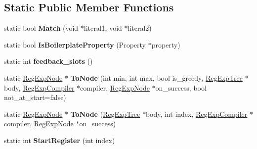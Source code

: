 \subsection*{Static Public Member Functions}
\begin{DoxyCompactItemize}
\item 
\hypertarget{classv8_1_1internal_1_1_v8___f_i_n_a_l_a3eaeaa0e38cbfa8e72233e319be96cd3}{}static bool {\bfseries Match} (void $\ast$literal1, void $\ast$literal2)\label{classv8_1_1internal_1_1_v8___f_i_n_a_l_a3eaeaa0e38cbfa8e72233e319be96cd3}

\item 
\hypertarget{classv8_1_1internal_1_1_v8___f_i_n_a_l_abe02742841dbe1b01ce6c53bb4fd34a1}{}static bool {\bfseries Is\+Boilerplate\+Property} (Property $\ast$property)\label{classv8_1_1internal_1_1_v8___f_i_n_a_l_abe02742841dbe1b01ce6c53bb4fd34a1}

\item 
\hypertarget{classv8_1_1internal_1_1_v8___f_i_n_a_l_a53a670fe9ff285ea7995d87fa5e948bc}{}static int {\bfseries feedback\+\_\+slots} ()\label{classv8_1_1internal_1_1_v8___f_i_n_a_l_a53a670fe9ff285ea7995d87fa5e948bc}

\item 
\hypertarget{classv8_1_1internal_1_1_v8___f_i_n_a_l_a2cd3e7b2b175fe7d08abf6feabbc0b47}{}static \hyperlink{classv8_1_1internal_1_1_reg_exp_node}{Reg\+Exp\+Node} $\ast$ {\bfseries To\+Node} (int min, int max, bool is\+\_\+greedy, \hyperlink{classv8_1_1internal_1_1_reg_exp_tree}{Reg\+Exp\+Tree} $\ast$body, \hyperlink{classv8_1_1internal_1_1_reg_exp_compiler}{Reg\+Exp\+Compiler} $\ast$compiler, \hyperlink{classv8_1_1internal_1_1_reg_exp_node}{Reg\+Exp\+Node} $\ast$on\+\_\+success, bool not\+\_\+at\+\_\+start=false)\label{classv8_1_1internal_1_1_v8___f_i_n_a_l_a2cd3e7b2b175fe7d08abf6feabbc0b47}

\item 
\hypertarget{classv8_1_1internal_1_1_v8___f_i_n_a_l_a83a1b5ac5b9623f457896edd1eb56fc3}{}static \hyperlink{classv8_1_1internal_1_1_reg_exp_node}{Reg\+Exp\+Node} $\ast$ {\bfseries To\+Node} (\hyperlink{classv8_1_1internal_1_1_reg_exp_tree}{Reg\+Exp\+Tree} $\ast$body, int index, \hyperlink{classv8_1_1internal_1_1_reg_exp_compiler}{Reg\+Exp\+Compiler} $\ast$compiler, \hyperlink{classv8_1_1internal_1_1_reg_exp_node}{Reg\+Exp\+Node} $\ast$on\+\_\+success)\label{classv8_1_1internal_1_1_v8___f_i_n_a_l_a83a1b5ac5b9623f457896edd1eb56fc3}

\item 
\hypertarget{classv8_1_1internal_1_1_v8___f_i_n_a_l_a75744902463ec263fee7a14f6080b8fc}{}static int {\bfseries Start\+Register} (int index)\label{classv8_1_1internal_1_1_v8___f_i_n_a_l_a75744902463ec263fee7a14f6080b8fc}


\end{DoxyCompactItemize}
